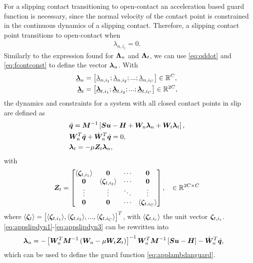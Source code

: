 \documentclass[../DC2017114Bouma.tex]{subfiles}
\begin{document}
For a slipping contact transitioning to open-contact an acceleration based guard function is necessary, since the normal velocity of the contact point is constrained in the continuous dynamics of a slipping contact. Therefore, a slipping contact point transitions to open-contact when
\begin{align}
\lambda_{n,i_c} = 0.\label{eq:applambdanguard}
\end{align}
Similarly to the expression found for $\boldsymbol{\Lambda}_{n}$ and $\boldsymbol{\Lambda}_{t}$, we can use \eqref{eq:qddot} and \eqref{eq:fcontconst} to define the vector $\boldsymbol{\lambda}_{n}$. With
\begin{align}
\underline{\boldsymbol{\lambda}}_n &= \begin{bmatrix}
\underline{\lambda}_{n,i_1};\underline{\lambda}_{n,i_2};...;\underline{\lambda}_{n,i_C} 
\end{bmatrix}\in\mathbb{R}^{C},\\
\underline{\boldsymbol{\lambda}}_t &= \begin{bmatrix}
\underline{\boldsymbol{\lambda}}_{t,i_1};\underline{\boldsymbol{\lambda}}_{t,i_2};...;\underline{\boldsymbol{\lambda}}_{t,i_C} 
\end{bmatrix}\in\mathbb{R}^{2C},
\end{align}
the dynamics and constraints for a system with all closed contact points in slip are defined as
\begin{align}
&\ddot{{\boldsymbol{q}}} = {\boldsymbol{M}}^{-1}\left[{\boldsymbol{S}}{\boldsymbol{u}} - {\boldsymbol{H}} + {\boldsymbol{W}}_{n}\boldsymbol{\lambda}_{n} + {\boldsymbol{W}}_{t}\boldsymbol{\lambda}_{t}\right],\label{eq:appslipdyn1}\\
&{\boldsymbol{W}}^T_{n}\ddot{{\boldsymbol{q}}} + \dot{{\boldsymbol{W}}}^T_{n}\dot{{\boldsymbol{q}}} = 0,\label{eq:appslipdyn2}\\
&\boldsymbol{\lambda}_{t} = -\mu{\boldsymbol{Z}}_{t}\boldsymbol{\lambda}_{n},\label{eq:appslipdyn3}
\end{align}
with 
\begin{align}
{\boldsymbol{Z}}_{t} = \begin{bmatrix}
\langle\boldsymbol{\zeta}_{t,i_1}\rangle & \mathbf{0} & \cdots & \mathbf{0}\\
\mathbf{0} & \langle\boldsymbol{\zeta}_{t,i_2}\rangle & \cdots & \mathbf{0}\\
\vdots & \vdots & \ddots & \vdots\\
\mathbf{0} & \mathbf{0} & \cdots & \langle\boldsymbol{\zeta}_{t,i_C}\rangle
\end{bmatrix},\quad\in\mathbb{R}^{2C \times C}\label{eq:appZt}
\end{align}
where $\langle\boldsymbol{\zeta}_{t}\rangle=\begin{bmatrix}\langle\boldsymbol{\zeta}_{t,i_1}\rangle,\langle\boldsymbol{\zeta}_{t,i_2}\rangle,...,\langle\boldsymbol{\zeta}_{t,i_C}\rangle \end{bmatrix}^T$, with $\langle\boldsymbol{\zeta}_{t,i_c}\rangle$ the unit vector $\boldsymbol{\zeta}_{t,i_c}$. \eqref{eq:appslipdyn1}-\eqref{eq:appslipdyn3} can be rewritten into
\begin{align}
&\boldsymbol{\lambda}_{n} = -\left[{\boldsymbol{W}}^T_{n}{\boldsymbol{M}}^{-1}\left({\boldsymbol{W}}_{n} - \mu{\boldsymbol{W}}_{t}{\boldsymbol{Z}}_{t}\right)\right]^{-1}{\boldsymbol{W}}^T_{n}{\boldsymbol{M}}^{-1}\left[{\boldsymbol{S}}{\boldsymbol{u}} - {\boldsymbol{H}}\right] - \dot{{\boldsymbol{W}}}^T_{n}\dot{{\boldsymbol{q}}},
\end{align}
which can be used to define the guard function \eqref{eq:applambdanguard}.
\end{document}
